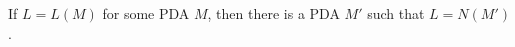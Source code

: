 

\setcounter{section}{6}
\setcounter{subsection}{3}
\setcounter{dfn}{7}

\begin{thm}
If $L = L(M)$ for some PDA $M$, then there is a PDA $M'$ such that $L = N(M')$.
\end{thm}



